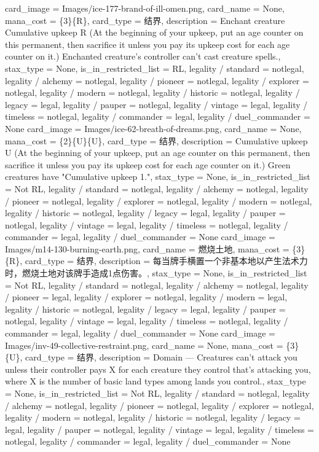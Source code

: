 \documentclass[lang = cn, color = black, 10pt]{AllThatStax}
\begin{document}
{
	card_image = Images/ice-177-brand-of-ill-omen.png,
	card_name = None,
	mana_cost = \{3\}\{R\},
	card_type = 结界,
	description = Enchant creature
	Cumulative upkeep {R} (At the beginning of your upkeep, put an age counter on this permanent, then sacrifice it unless you pay its upkeep cost for each age counter on it.)
	Enchanted creature's controller can't cast creature spells.,
	stax_type = None,
	is_in_restricted_list = RL,
	legality / standard = notlegal,
	legality / alchemy = notlegal,
	legality / pioneer = notlegal,
	legality / explorer = notlegal,
	legality / modern = notlegal,
	legality / historic = notlegal,
	legality / legacy = legal,
	legality / pauper = notlegal,
	legality / vintage = legal,
	legality / timeless = notlegal,
	legality / commander = legal,
	legality / duel_commander = None
}
\card
{
	card_image = Images/ice-62-breath-of-dreams.png,
	card_name = None,
	mana_cost = \{2\}\{U\}\{U\},
	card_type = 结界,
	description = Cumulative upkeep {U} (At the beginning of your upkeep, put an age counter on this permanent, then sacrifice it unless you pay its upkeep cost for each age counter on it.)
	Green creatures have "Cumulative upkeep {1}.",
	stax_type = None,
	is_in_restricted_list = Not RL,
	legality / standard = notlegal,
	legality / alchemy = notlegal,
	legality / pioneer = notlegal,
	legality / explorer = notlegal,
	legality / modern = notlegal,
	legality / historic = notlegal,
	legality / legacy = legal,
	legality / pauper = notlegal,
	legality / vintage = legal,
	legality / timeless = notlegal,
	legality / commander = legal,
	legality / duel_commander = None
}
\card
{
	card_image = Images/m14-130-burning-earth.png,
	card_name = 燃烧土地,
	mana_cost = \{3\}\{R\},
	card_type = 结界,
	description = 每当牌手横置一个非基本地以产生法术力时，燃烧土地对该牌手造成1点伤害。,
	stax_type = None,
	is_in_restricted_list = Not RL,
	legality / standard = notlegal,
	legality / alchemy = notlegal,
	legality / pioneer = legal,
	legality / explorer = notlegal,
	legality / modern = legal,
	legality / historic = notlegal,
	legality / legacy = legal,
	legality / pauper = notlegal,
	legality / vintage = legal,
	legality / timeless = notlegal,
	legality / commander = legal,
	legality / duel_commander = None
}
\card
{
	card_image = Images/inv-49-collective-restraint.png,
	card_name = None,
	mana_cost = \{3\}\{U\},
	card_type = 结界,
	description = Domain — Creatures can't attack you unless their controller pays {X} for each creature they control that's attacking you, where X is the number of basic land types among lands you control.,
	stax_type = None,
	is_in_restricted_list = Not RL,
	legality / standard = notlegal,
	legality / alchemy = notlegal,
	legality / pioneer = notlegal,
	legality / explorer = notlegal,
	legality / modern = notlegal,
	legality / historic = notlegal,
	legality / legacy = legal,
	legality / pauper = notlegal,
	legality / vintage = legal,
	legality / timeless = notlegal,
	legality / commander = legal,
	legality / duel_commander = None
}
\end{document}
